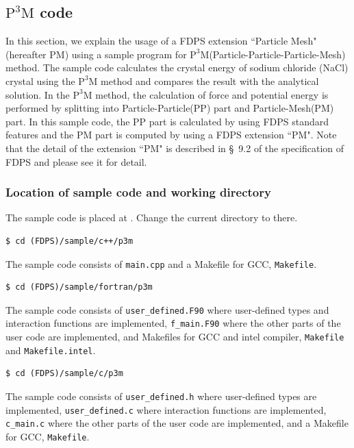 \subsection{$\mathrm{P^{3}M}$ code} \label{subsec:P3M}
In this section, we explain the usage of a FDPS extension ``Particle Mesh" (hereafter \textsf{PM}) using a sample program for $\mathrm{P^{3}M}$(Particle-Particle-Particle-Mesh) method. The sample code calculates the crystal energy of sodium chloride (NaCl) crystal using the $\mathrm{P^{3}M}$ method and compares the result with the analytical solution. In the $\mathrm{P^{3}M}$ method, the calculation of force and potential energy is performed by splitting into Particle-Particle(PP) part and Particle-Mesh(PM) part. In this sample code, the PP part is calculated by using FDPS standard features and the PM part is computed by using a FDPS extension ``PM". Note that the detail of the extension ``\textsf{PM}" is described in \S~9.2 of the specification of FDPS and please see it for detail.

\subsubsection{Location of sample code and working directory}
The sample code is placed at \dirNamePPPMSample.
Change the current directory to there.
\ifCpp
\begin{screen}
\begin{verbatim}
$ cd (FDPS)/sample/c++/p3m
\end{verbatim}
\end{screen}
The sample code consists of \texttt{main.cpp} and a Makefile for GCC, \texttt{Makefile}.
\endifCpp
\ifFtn
\begin{screen}
\begin{verbatim}
$ cd (FDPS)/sample/fortran/p3m
\end{verbatim}
\end{screen}
The sample code consists of \texttt{user\_defined.F90} where user-defined types and interaction functions are implemented, \texttt{f\_main.F90} where the other parts of the user code are implemented, and Makefiles for GCC and intel compiler, \texttt{Makefile} and \texttt{Makefile.intel}.
\endifFtn
\ifC
\begin{screen}
\begin{verbatim}
$ cd (FDPS)/sample/c/p3m
\end{verbatim}
\end{screen}
The sample code consists of \texttt{user\_defined.h} where user-defined types are implemented, \texttt{user\_defined.c} where interaction functions are implemented, \texttt{c\_main.c} where the other parts of the user code are implemented, and a Makefile for GCC, \texttt{Makefile}.
\endifC

